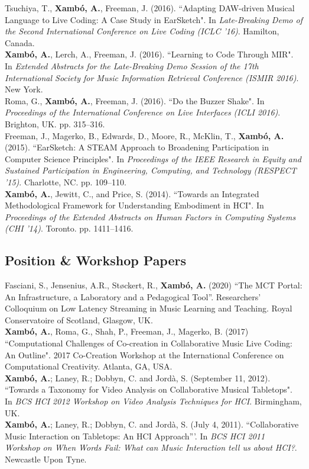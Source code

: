 \documentclass[10pt, a4paper]{article}
\newcommand{\years}[1]{\marginnote{\scriptsize #1}}
\begin{document}
\years{2016c}Tsuchiya, T., \textbf{Xambó, A.}, Freeman, J. (2016). “Adapting DAW-driven Musical Language to Live Coding: A Case Study in EarSketch". In \emph{Late-Breaking Demo of the Second International Conference on Live Coding (ICLC '16)}. Hamilton, Canada.\\ 
\years{2016b}\textbf{Xambó, A.}, Lerch, A., Freeman, J. (2016). “Learning to Code Through MIR". In \emph{Extended Abstracts for the Late-Breaking Demo Session of the 17th International Society for Music Information Retrieval Conference (ISMIR 2016)}. New York.\\
\years{2016a}Roma, G., \textbf{Xambó, A.}, Freeman, J. (2016). “Do the Buzzer Shake". In \emph{Proceedings of the International Conference on Live Interfaces (ICLI 2016)}. Brighton, UK. pp. 315--316.\\
\years{2015}Freeman, J., Magerko, B., Edwards, D., Moore, R., McKlin, T., \textbf{Xambó, A.} (2015). “EarSketch: A STEAM Approach to Broadening Participation in Computer Science Principles". In \emph{Proceedings of the IEEE Research in Equity and Sustained Participation in Engineering, Computing, and Technology (RESPECT '15)}. Charlotte, NC. pp. 109--110.\\
\years{2014}\textbf{Xambó, A.}, Jewitt, C., and Price, S. (2014). “Towards an Integrated Methodological Framework for Understanding Embodiment in HCI". In \emph{Proceedings of the Extended Abstracts on Human Factors in Computing Systems (CHI '14)}. Toronto. pp. 1411--1416.

\subsection*{Position \& Workshop Papers}
\noindent

\years{2020}Fasciani, S., Jensenius, A.R., Støckert, R., \textbf{Xambó, A.} (2020) ``The MCT Portal: An Infrastructure, a Laboratory and a Pedagogical Tool''. Researchers’ Colloquium on Low Latency Streaming in Music Learning and Teaching. Royal Conservatoire of Scotland, Glasgow, UK.\\
\years{2017}\textbf{Xambó, A.}, Roma, G., Shah, P., Freeman, J., Magerko, B. (2017) “Computational Challenges of Co-creation in Collaborative Music Live Coding: An Outline". 2017 Co-Creation Workshop at the International Conference on Computational Creativity. Atlanta, GA, USA.\\ 
\years{2012}\textbf{Xambó, A.}; Laney, R.; Dobbyn, C. and Jordà, S. (September 11, 2012). “Towards a Taxonomy for Video Analysis on Collaborative Musical Tabletops". In \emph{BCS HCI 2012 Workshop on Video Analysis Techniques for HCI}. Birmingham, UK.\\
\years{2011}\textbf{Xambó, A.}; Laney, R.; Dobbyn, C. and Jordà, S. (July 4, 2011). ``Collaborative Music Interaction on Tabletops: An HCI Approach'''. In \emph{BCS HCI 2011 Workshop on When Words Fail: What can Music Interaction tell us about HCI?}. Newcastle Upon Tyne.
\end{document}
